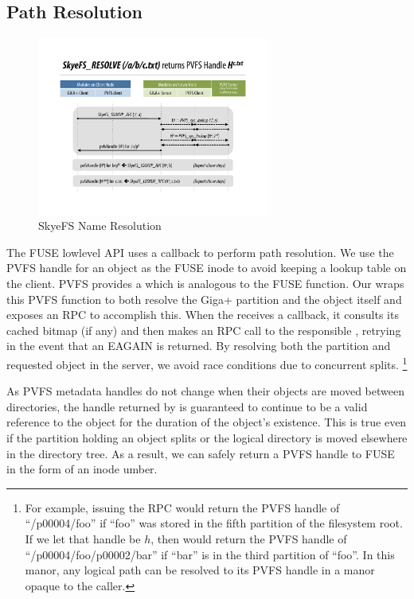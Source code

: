 \documentclass[onecolumn, 11pt, letterpaper]{article}
\begin{document}
\subsection{Path Resolution}
\begin{figure}
\begin{center}
\includegraphics[width=3in]{figure-resolve}
\end{center}
\caption{SkyeFS Name Resolution}
\end{figure}
The FUSE lowlevel API uses a  callback to perform
path resolution.  We use the PVFS handle for an object as the FUSE inode to
avoid keeping a lookup table on the client.  PVFS provides a
 which is analogous to the
FUSE  function.  Our  wraps this PVFS function
to both resolve the Giga+ partition and the object itself and exposes an
 RPC to accomplish this.  When the  receives a
 callback, it consults its cached bitmap (if any) and then
makes an RPC call to the responsible , retrying in the
event that an EAGAIN is returned.  By resolving both the partition and
requested object in the server, we avoid race conditions due to concurrent
splits.  \footnote{For example, issuing the RPC 
would return the PVFS handle of ``/p00004/foo'' if ``foo'' was stored in the
fifth partition of the filesystem root.  If we let that handle be $h$, then
 would return the PVFS handle of
``/p00004/foo/p00002/bar'' if ``bar'' is in the third partition of ``foo''.
In this manor, any logical path can be resolved to its PVFS handle in a manor
opaque to the caller.}

As PVFS metadata handles do not change when their objects are moved between
directories, the handle returned by  is guaranteed to continue to
be a valid reference to the object for the duration of the object's existence.
This is true even if the partition holding an object splits or the logical
directory is moved elsewhere in the directory tree.  As a result, we can
safely return a PVFS handle to FUSE in the form of an inode umber.
\end{document}
